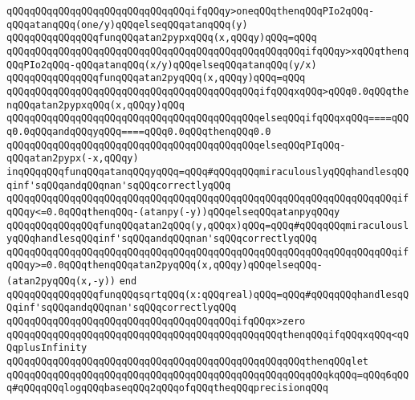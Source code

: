 \verb|qQQqqQQqqQQqqQQqqQQqqQQqqQQqqQQqifqQQqy>oneqQQqthenqQQqPIo2qQQq-qQQqatanqQQq(one/y)qQQqelseqQQqatanqQQq(y)|\newline
\newline
\verb|qQQqqQQqqQQqqQQqfunqQQqatan2pypxqQQq(x,qQQqy)qQQq=qQQq|\newline
\verb|qQQqqQQqqQQqqQQqqQQqqQQqqQQqqQQqqQQqqQQqqQQqqQQqqQQqifqQQqy>xqQQqthenqQQqPIo2qQQq-qQQqatanqQQq(x/y)qQQqelseqQQqatanqQQq(y/x)|\newline
\newline
\verb|qQQqqQQqqQQqqQQqfunqQQqatan2pyqQQq(x,qQQqy)qQQq=qQQq|\newline
\verb|qQQqqQQqqQQqqQQqqQQqqQQqqQQqqQQqqQQqqQQqqQQqifqQQqxqQQq>qQQq0.0qQQqthenqQQqatan2pypxqQQq(x,qQQqy)qQQq|\newline
\verb|qQQqqQQqqQQqqQQqqQQqqQQqqQQqqQQqqQQqqQQqqQQqelseqQQqifqQQqxqQQq====qQQq0.0qQQqandqQQqyqQQq====qQQq0.0qQQqthenqQQq0.0|\newline
\verb|qQQqqQQqqQQqqQQqqQQqqQQqqQQqqQQqqQQqqQQqqQQqelseqQQqPIqQQq-qQQqatan2pypx(-x,qQQqy)|\newline
\newline
\verb|inqQQqqQQqfunqQQqatanqQQqyqQQq=qQQq#qQQqqQQqmiraculouslyqQQqhandlesqQQqinf'sqQQqandqQQqnan'sqQQqcorrectlyqQQq|\newline
\verb|qQQqqQQqqQQqqQQqqQQqqQQqqQQqqQQqqQQqqQQqqQQqqQQqqQQqqQQqqQQqqQQqqQQqifqQQqy<=0.0qQQqthenqQQq-(atanpy(-y))qQQqelseqQQqatanpyqQQqy|\newline
\newline
\verb|qQQqqQQqqQQqqQQqfunqQQqatan2qQQq(y,qQQqx)qQQq=qQQq#qQQqqQQqmiraculouslyqQQqhandlesqQQqinf'sqQQqandqQQqnan'sqQQqcorrectlyqQQq|\newline
\verb|qQQqqQQqqQQqqQQqqQQqqQQqqQQqqQQqqQQqqQQqqQQqqQQqqQQqqQQqqQQqqQQqqQQqifqQQqy>=0.0qQQqthenqQQqatan2pyqQQq(x,qQQqy)qQQqelseqQQq-(atan2pyqQQq(x,-y))|\newline
\verb|end|\newline
\newline
\verb|qQQqqQQqqQQqqQQqfunqQQqsqrtqQQq(x:qQQqreal)qQQq=qQQq#qQQqqQQqhandlesqQQqinf'sqQQqandqQQqnan'sqQQqcorrectlyqQQq|\newline
\verb|qQQqqQQqqQQqqQQqqQQqqQQqqQQqqQQqqQQqqQQqifqQQqx>zero|\newline
\verb|qQQqqQQqqQQqqQQqqQQqqQQqqQQqqQQqqQQqqQQqqQQqqQQqthenqQQqifqQQqxqQQq<qQQqplusInfinity|\newline
\verb|qQQqqQQqqQQqqQQqqQQqqQQqqQQqqQQqqQQqqQQqqQQqqQQqqQQqthenqQQqlet|\newline
\verb|qQQqqQQqqQQqqQQqqQQqqQQqqQQqqQQqqQQqqQQqqQQqqQQqqQQqqQQqkqQQq=qQQq6qQQq#qQQqqQQqlogqQQqbaseqQQq2qQQqofqQQqtheqQQqprecisionqQQq|\newline
